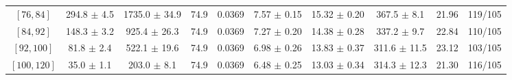 \begin{tabular}{c||c|c|c|c|c|c|c||c|c}
$[76, 84]$ & 294.8 $\pm$ 4.5 & 1735.0 $\pm$ 34.9 & 74.9 & 0.0369 & 7.57 $\pm$ 0.15 & 15.32 $\pm$ 0.20 & 367.5 $\pm$ 8.1 & 21.96 & 119/105\\
$[84, 92]$ & 148.3 $\pm$ 3.2 & 925.4 $\pm$ 26.3 & 74.9 & 0.0369 & 7.27 $\pm$ 0.20 & 14.38 $\pm$ 0.28 & 337.2 $\pm$ 9.7 & 22.84 & 110/105\\
$[92, 100]$ & 81.8 $\pm$ 2.4 & 522.1 $\pm$ 19.6 & 74.9 & 0.0369 & 6.98 $\pm$ 0.26 & 13.83 $\pm$ 0.37 & 311.6 $\pm$ 11.5 & 23.12 & 103/105\\
$[100, 120]$ & 35.0 $\pm$ 1.1 & 203.0 $\pm$ 8.1 & 74.9 & 0.0369 & 6.48 $\pm$ 0.25 & 13.03 $\pm$ 0.34 & 314.3 $\pm$ 12.3 & 21.30 & 116/105\\
\end{tabular}

